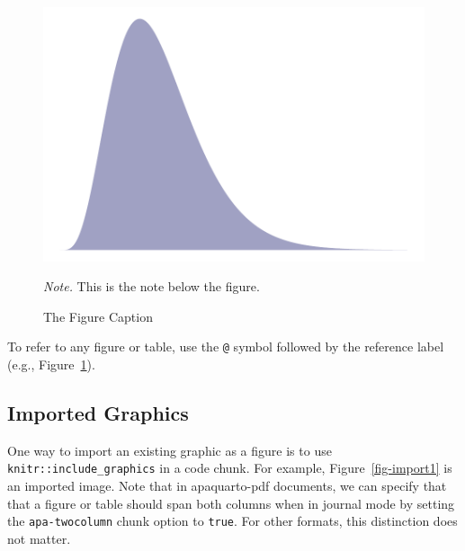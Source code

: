 \documentclass[
  jou,
  longtable,
  colorlinks=true,linkcolor=blue,citecolor=blue,urlcolor=blue]{apa7}
\begin{document}
\begin{figure}[!htbp]

{\caption{{The Figure Caption}{\label{fig-myplot}}}}

\includegraphics{modi_golnick_files/figure-pdf/fig-myplot-1.pdf}

{\noindent \emph{Note.} This is the note below the figure.}

\end{figure}

To refer to any figure or table, use the \texttt{@} symbol followed by
the reference label (e.g., Figure~\ref{fig-myplot}).

\subsection{Imported Graphics}\label{imported-graphics}

One way to import an existing graphic as a figure is to use
\texttt{knitr::include\_graphics} in a code chunk. For example,
Figure~\ref{fig-import1} is an imported image. Note that in
apaquarto-pdf documents, we can specify that that a figure or table
should span both columns when in journal mode by setting the
\texttt{apa-twocolumn} chunk option to \texttt{true}. For other formats,
this distinction does not matter.
\end{document}
